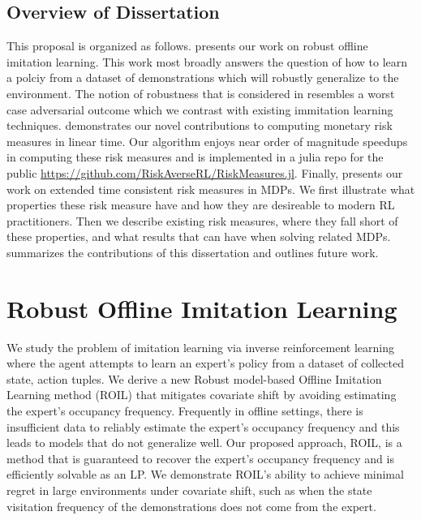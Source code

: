 \documentclass[12pt,letterpaper,oneside]{report}
\theoremstyle{plain}
\theoremstyle{definition}
\theoremstyle{remark}
\begin{document}
\section{Overview of Dissertation}\label{sec:overview-outline}

This proposal is organized as follows.  presents our work on robust offline imitation learning. This work most broadly answers the question of how to learn a polciy from a dataset of demonstrations which will robustly generalize to the environment. The notion of robustness that is considered in  resembles a worst case adversarial outcome which we contrast with existing immitation learning techniques.  demonstrates our novel contributions to computing monetary risk measures in linear time. Our algorithm enjoys near order of magnitude speedups in computing these risk measures and is implemented in a julia repo for the public \url{https://github.com/RiskAverseRL/RiskMeasures.jl}. Finally,  presents our work on extended time consistent risk measures in MDPs. We first illustrate what properties these risk measure have and how they are desireable to modern RL practitioners. Then we describe existing risk measures, where they fall short of these properties, and what results that can have when solving related MDPs.  summarizes the contributions of this dissertation and outlines future work.

\chapter{Robust Offline Imitation Learning}\label{ch:roil}

We study the problem of imitation learning via inverse reinforcement learning where the agent attempts to learn an expert's policy from a dataset of collected state, action tuples. We derive a new Robust model-based Offline Imitation Learning method (ROIL) that mitigates covariate shift by avoiding estimating the expert's occupancy frequency. Frequently in offline settings, there is insufficient data to reliably estimate the expert's occupancy frequency and this leads to models that do not generalize well. Our proposed approach, ROIL, is a method that is guaranteed to recover the expert's occupancy frequency and is efficiently solvable as an LP. We demonstrate ROIL's ability to achieve minimal regret in large environments under covariate shift, such as when the state visitation frequency of the demonstrations does not come from the expert.
\end{document}
